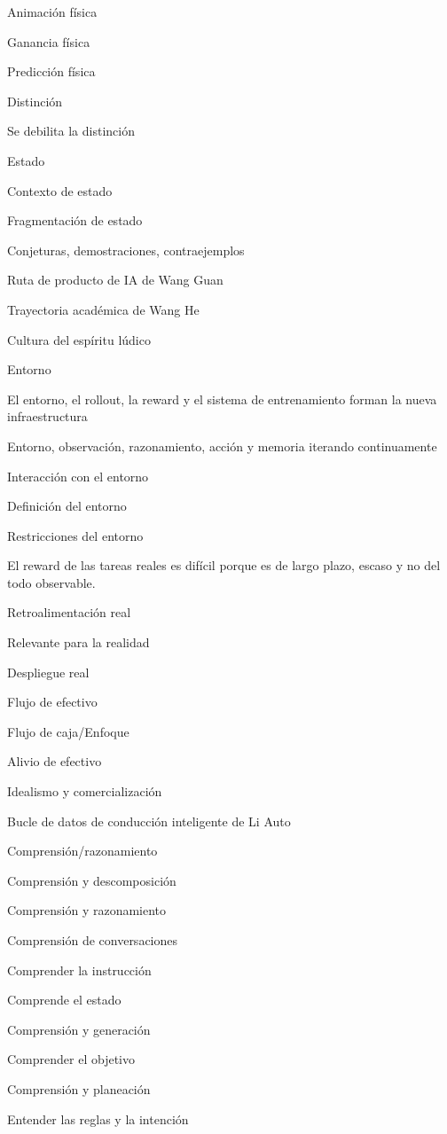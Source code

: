\documentclass{article}
\begin{document}
Animación física

Ganancia física

Predicción física

Distinción

Se debilita la distinción

Estado

Contexto de estado

Fragmentación de estado

Conjeturas, demostraciones, contraejemplos

Ruta de producto de IA de Wang Guan

Trayectoria académica de Wang He

Cultura del espíritu lúdico

Entorno

El entorno, el rollout, la reward y el sistema de entrenamiento forman la nueva infraestructura

Entorno, observación, razonamiento, acción y memoria iterando continuamente

Interacción con el entorno

Definición del entorno

Restricciones del entorno

El reward de las tareas reales es difícil porque es de largo plazo, escaso y no del todo observable.

Retroalimentación real

Relevante para la realidad

Despliegue real

Flujo de efectivo

Flujo de caja/Enfoque

Alivio de efectivo

Idealismo y comercialización

Bucle de datos de conducción inteligente de Li Auto

Comprensión/razonamiento

Comprensión y descomposición

Comprensión y razonamiento

Comprensión de conversaciones

Comprender la instrucción

Comprende el estado

Comprensión y generación

Comprender el objetivo

Comprensión y planeación

Entender las reglas y la intención
\end{document}
